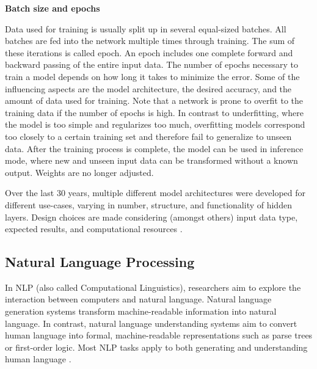 \textbf{Batch size and epochs}

Data used for training is usually split up in several equal-sized batches. All batches are fed into the network multiple times through training. The sum of these iterations is called epoch. An epoch includes one complete forward and backward passing of the entire input data.
The number of epochs necessary to train a model depends on how long it takes to minimize the error. Some of the influencing aspects are the model architecture, the desired accuracy, and the amount of data used for training.
Note that a network is prone to overfit to the training data if the number of epochs is high. In contrast to underfitting, where the model is too simple and regularizes too much, overfitting models correspond too closely to a certain training set and therefore fail to generalize to unseen data. 
After the training process is complete, the model can be used in inference mode, where new and unseen input data can be transformed without a known output. Weights are no longer adjusted.

Over the last 30 years, multiple different model architectures were developed for different use-cases, varying in number, structure, and functionality of hidden layers. Design choices are made considering (amongst others) input data type, expected results, and computational resources \cite{buduma2017fundamentals}. 


\subsection{Natural Language Processing}
\label{sec:natural_language_processing}

In NLP (also called Computational Linguistics), researchers aim to explore the interaction between computers and natural language. Natural language generation systems transform machine-readable information into natural language. In contrast, natural language understanding systems aim to convert human language into formal, machine-readable representations such as parse trees or first-order logic. Most NLP tasks apply to both generating and understanding human language \cite{kumar2011natural}.

